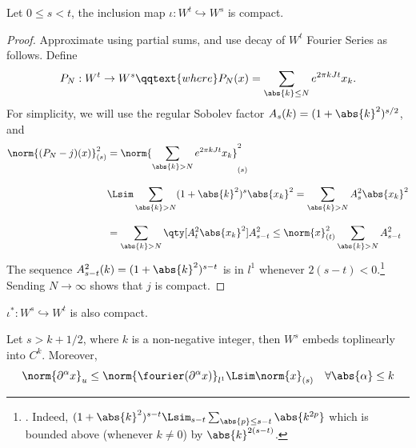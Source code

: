 \documentclass[../main-v2-manifolds.tex]{subfiles}
\begin{document}
\begin{wts}
    Let $0\leq s < t$, the inclusion map $\iota: W^t \hookrightarrow W^s$ is compact.
\end{wts}
\begin{proof}
    Approximate using partial sums, and use decay of $W^t$ Fourier Series as follows. Define
    \[
        P_N: W^{t}\to W^{s}\qqtext{where}P_N(x) = \sum_{\abs{k}\leq N} e^{2\pi kJ t}x_k.
    \]
    For simplicity, we will use the regular Sobolev factor $A_s(k) = (1+\abs{k}^2)^{s/2}$, and
    \begin{align*}
        \norm{(P_N - j)(x)}^2_{(s)} &= \norm{\sum_{\abs{k}>N} e^{2\pi kJ t}x_k}^2_{(s)}\\[2ex]
        &\Lsim \sum_{\abs{k}>N} (1+\abs{k}^2)^{s}\abs{x_k}^2 = \sum_{\abs{k}>N} A_s^2\abs{x_k}^2\\[2ex]
        &= \sum_{\abs{k}>N}\qty[A_{t}^2\abs{x_k}^2] A^2_{s-t} \leq \norm{x}^2_{(t)}\sum_{\abs{k}>N} A^2_{s-t}
    \end{align*}
    The sequence $A_{s-t}^2(k) = (1+\abs{k}^2)^{s-t}$ is in $l^1$ whenever $2(s-t)<0$.\footnote{. Indeed, $(1+\abs{k}^2)^{s-t}\Lsim_{s-t}\sum_{\abs{p}\leq s-t}\abs{k^{2p}}$
    which is bounded above (whenever $k\neq 0$) by $\abs{k}^{2(s-t)}$.} Sending $N\to\infty$ shows that $j$ is compact.
\end{proof}
\begin{corollary}
    $\iota^*: W^s \hookrightarrow W^t$ is also compact.
\end{corollary}
\begin{wts}
    Let $s> k + 1/2$, where $k$ is a non-negative integer, then $W^s$ embeds toplinearly into $C^{k}$. Moreover,
    \[
        \norm{\partial^{\alpha} x}_u\leq \norm{\fourier(\partial^{\alpha}x)}_{l^1}\Lsim \norm{x}_{(s)}\quad\forall\abs{\alpha}\leq k
    \]
\end{wts}
\end{document}
